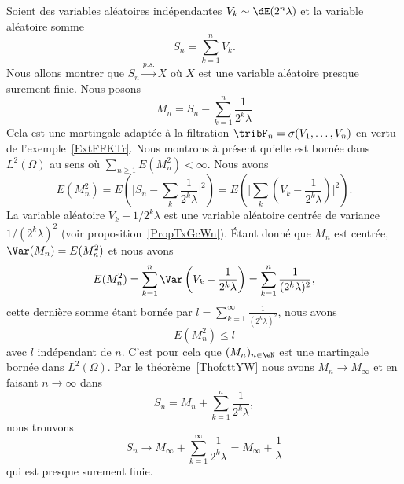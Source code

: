 \begin{example}
    Soient des variables aléatoires indépendantes \( V_k\sim\dE(2^n\lambda)\) et la variable aléatoire somme
    \begin{equation}
        S_n=\sum_{k=1}^nV_k.
    \end{equation}
    Nous allons montrer que \( S_n\stackrel{p.s.}{\longrightarrow}X\) où \( X\) est une variable aléatoire presque surement finie. Nous posons
    \begin{equation}
        M_n=S_n-\sum_{k=1}^n\frac{1}{ 2^k\lambda }
    \end{equation}
    Cela est une martingale adaptée à la filtration \( \tribF_n=\sigma(V_1,\ldots, V_n)\) en vertu de l'exemple~\ref{ExtFFKTr}. Nous montrons à présent qu'elle est bornée dans \( L^2(\Omega)\) au sens où \( \sum_{n\geq 1}E(M_n^2)<\infty\). Nous avons
    \begin{equation}
        E(M_n^2)=E\left( \big[ S_n-\sum_k\frac{1}{ 2^k\lambda } \big]^2 \right)=E\left( \big[ \sum_k(V_k-\frac{1}{ 2^k\lambda }) \big]^2 \right).
    \end{equation}
    La variable aléatoire \( V_k-1/2^k\lambda\) est une variable aléatoire centrée de variance \( 1/(2^k\lambda)^2\) (voir proposition~\ref{PropTxGcWn}). Étant donné que \( M_n\) est centrée, \( \Var(M_n)=E(M_n^2)\) et nous avons
    \begin{equation}
        E(M_n^2)=\sum_{k=1}^n\Var\left( V_k-\frac{1}{ 2^k\lambda } \right)=\sum_{k=1}^n\frac{1}{ (2^k\lambda)^2 },
    \end{equation}
    cette dernière somme étant bornée par \( l=\sum_{k=1}^{\infty}\frac{1}{ (2^k\lambda)^2 }\), nous avons
    \begin{equation}
        E(M_n^2)\leq l
    \end{equation}
    avec \( l\) indépendant de \( n\). C'est pour cela que \( (M_n)_{n\in \eN}\) est une martingale bornée dans \( L^2(\Omega)\). Par le théorème~\ref{ThofcttYW} nous avons \( M_n\to M_{\infty}\) et en faisant \( n\to \infty\) dans
    \begin{equation}
        S_n=M_n+\sum_{k=1}^n\frac{1}{ 2^k\lambda },
    \end{equation}
    nous trouvons
    \begin{equation}
        S_n\to M_{\infty}+\sum_{k=1}^{\infty}\frac{1}{ 2^k\lambda }=M_{\infty}+\frac{1}{ \lambda }
    \end{equation}
    qui est presque surement finie.
\end{example}


